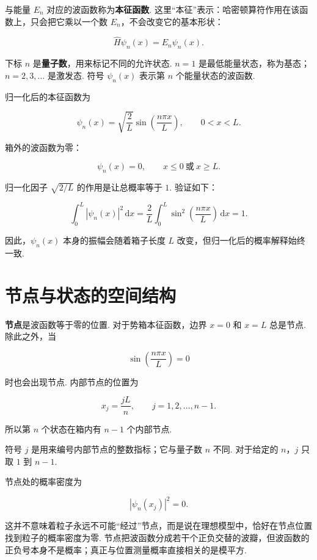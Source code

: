 \documentclass[UTF8,11pt,a4paper,openany]{ctexbook}
\newcommand{\dd}{\,\mathrm d}\newcommand{\Ham}{\hat H}\newcommand{\tr}{\operatorname{Tr}}
\newcommand{\term}[1]{\textbf{#1}}
\begin{document}
与能量 $E_n$ 对应的波函数称为\term{本征函数}. 这里“本征”表示：哈密顿算符作用在该函数上，只会把它乘以一个数 $E_n$，不会改变它的基本形状：

\[
\Ham\psi_n(x)=E_n\psi_n(x).
\]

\begin{notationbox}
下标 $n$ 是\term{量子数}，用来标记不同的允许状态. $n=1$ 是最低能量状态，称为基态；$n=2,3,\ldots$ 是激发态. 符号 $\psi_n(x)$ 表示第 $n$ 个能量状态的波函数. 
\end{notationbox}

归一化后的本征函数为

\[
\psi_n(x)=\sqrt{\frac{2}{L}}\sin\left(\frac{n\pi x}{L}\right),
\qquad 0<x<L.
\]

箱外的波函数为零：

\[
\psi_n(x)=0,\qquad x\leq0\ \text{或}\ x\geq L.
\]

归一化因子 $\sqrt{2/L}$ 的作用是让总概率等于 $1$. 验证如下：

\[
\int_0^L|\psi_n(x)|^2\dd x
=\frac{2}{L}\int_0^L\sin^2\left(\frac{n\pi x}{L}\right)\dd x
=1.
\]

因此，$\psi_n(x)$ 本身的振幅会随着箱子长度 $L$ 改变，但归一化后的概率解释始终一致. 

\section{节点与状态的空间结构}

\term{节点}是波函数等于零的位置. 对于势箱本征函数，边界 $x=0$ 和 $x=L$ 总是节点. 除此之外，当

\[
\sin\left(\frac{n\pi x}{L}\right)=0
\]

时也会出现节点. 内部节点的位置为

\[
x_j=\frac{jL}{n},
\qquad j=1,2,\ldots,n-1.
\]

所以第 $n$ 个状态在箱内有 $n-1$ 个内部节点. 

\begin{notationbox}
符号 $j$ 是用来编号内部节点的整数指标；它与量子数 $n$ 不同. 对于给定的 $n$，$j$ 只取 $1$ 到 $n-1$. 
\end{notationbox}

节点处的概率密度为

\[
|\psi_n(x_j)|^2=0.
\]

这并不意味着粒子永远不可能“经过”节点，而是说在理想模型中，恰好在节点位置找到粒子的概率密度为零. 节点把波函数分成若干个正负交替的波瓣，但波函数的正负号本身不是概率；真正与位置测量概率直接相关的是模平方. 
\end{document}

